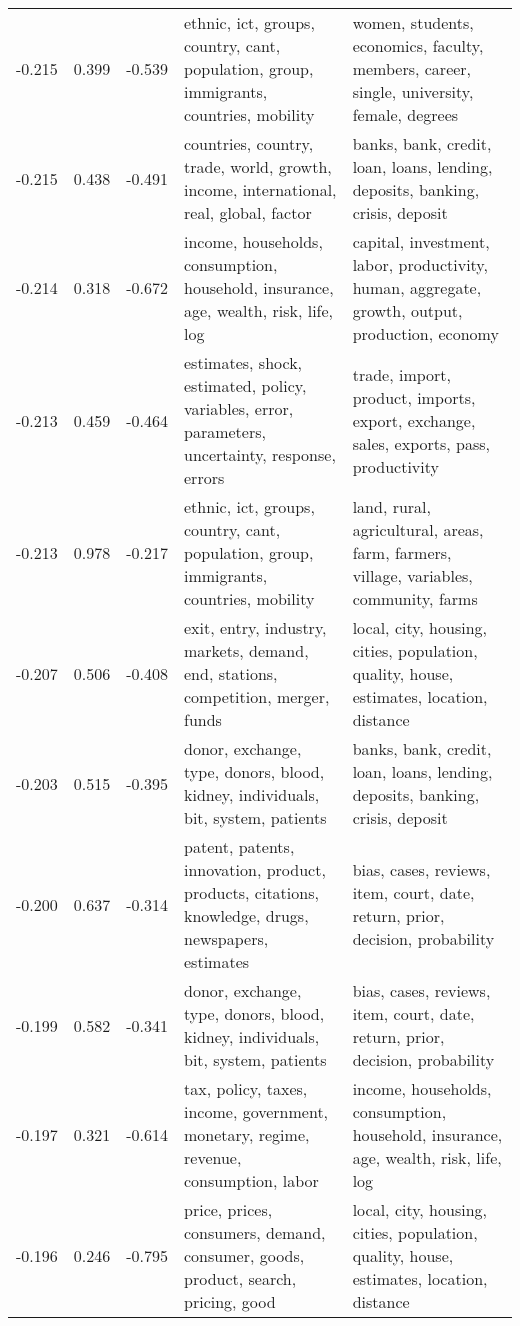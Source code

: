 \begin{tabular}{cccp{5cm}p{5cm}}
-0.215 & 0.399 & -0.539 & ethnic, ict, groups, country, cant, population, group, immigrants, countries, mobility & women, students, economics, faculty, members, career, single, university, female, degrees \\
-0.215 & 0.438 & -0.491 & countries, country, trade, world, growth, income, international, real, global, factor & banks, bank, credit, loan, loans, lending, deposits, banking, crisis, deposit \\
-0.214 & 0.318 & -0.672 & income, households, consumption, household, insurance, age, wealth, risk, life, log & capital, investment, labor, productivity, human, aggregate, growth, output, production, economy \\
-0.213 & 0.459 & -0.464 & estimates, shock, estimated, policy, variables, error, parameters, uncertainty, response, errors & trade, import, product, imports, export, exchange, sales, exports, pass, productivity \\
-0.213 & 0.978 & -0.217 & ethnic, ict, groups, country, cant, population, group, immigrants, countries, mobility & land, rural, agricultural, areas, farm, farmers, village, variables, community, farms \\
-0.207 & 0.506 & -0.408 & exit, entry, industry, markets, demand, end, stations, competition, merger, funds & local, city, housing, cities, population, quality, house, estimates, location, distance \\
-0.203 & 0.515 & -0.395 & donor, exchange, type, donors, blood, kidney, individuals, bit, system, patients & banks, bank, credit, loan, loans, lending, deposits, banking, crisis, deposit \\
-0.200 & 0.637 & -0.314 & patent, patents, innovation, product, products, citations, knowledge, drugs, newspapers, estimates & bias, cases, reviews, item, court, date, return, prior, decision, probability \\
-0.199 & 0.582 & -0.341 & donor, exchange, type, donors, blood, kidney, individuals, bit, system, patients & bias, cases, reviews, item, court, date, return, prior, decision, probability \\
-0.197 & 0.321 & -0.614 & tax, policy, taxes, income, government, monetary, regime, revenue, consumption, labor & income, households, consumption, household, insurance, age, wealth, risk, life, log \\
-0.196 & 0.246 & -0.795 & price, prices, consumers, demand, consumer, goods, product, search, pricing, good & local, city, housing, cities, population, quality, house, estimates, location, distance \\

\end{tabular}
